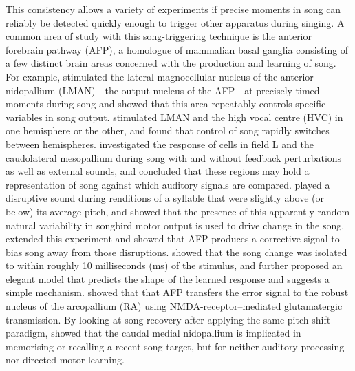 \documentclass[10pt,letterpaper]{article}
\begin{document}
This consistency allows a variety of experiments if precise moments in
song can reliably be detected quickly enough to trigger other
apparatus during singing.  A common area of study with this
song-triggering technique is the anterior forebrain pathway (AFP), a
homologue of mammalian basal ganglia consisting of a few distinct
brain areas concerned with the production and learning of song.  For
example, \cite{Kao2005} stimulated the lateral magnocellular nucleus
of the anterior nidopallium (LMAN)---the output nucleus of the
AFP---at precisely timed moments during song and showed that this area
repeatably controls specific variables in song output.
\cite{Wang2008interhemispheric} stimulated LMAN and the high vocal
centre (HVC) in one hemisphere or the other, and found that control of
song rapidly switches between hemispheres.  \cite{Keller2009}
investigated the response of cells in field L and the caudolateral
mesopallium during song with and without feedback perturbations as
well as external sounds, and concluded that these regions may hold a
representation of song against which auditory signals are compared.
\cite{Tumer2007pitchshift} played a disruptive sound during renditions
of a syllable that were slightly above (or below) its average pitch,
and showed that the presence of this apparently random natural
variability in songbird motor output is used to drive change in the
song.  \cite{Andalman2009} extended this experiment and showed that
AFP produces a corrective signal to bias song away from those
disruptions.  \cite{Charlesworth2011learning} showed that the song
change was isolated to within roughly 10 milliseconds (ms) of the
stimulus, and further proposed an elegant model that predicts the
shape of the learned response and suggests a simple mechanism.
\cite{Warren2011} showed that that AFP transfers the error signal to
the robust nucleus of the arcopallium (RA) using
NMDA-receptor--mediated glutamatergic transmission. By looking at song
recovery after applying the same pitch-shift paradigm,
\cite{Canopoli2014} showed that the caudal medial nidopallium is
implicated in memorising or recalling a recent song target, but for
neither auditory processing nor directed motor learning.

\end{document}
